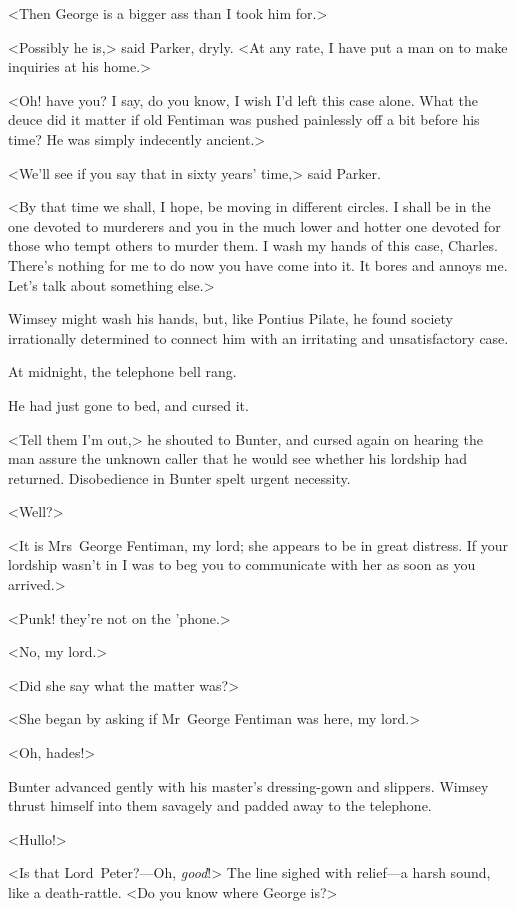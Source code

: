 <Then George is a bigger ass than I took him for.>

<Possibly he is,> said Parker, dryly. <At any rate, I have put a man on to make inquiries at his home.>

<Oh! have you? I say, do you know, I wish I'd left this case alone. What the deuce did it matter if old Fentiman was pushed painlessly off a bit before his time? He was simply indecently ancient.>

<We'll see if you say that in sixty years' time,> said Parker.

<By that time we shall, I hope, be moving in different circles. I shall be in the one devoted to murderers and you in the much lower and hotter one devoted for those who tempt others to murder them. I wash my hands of this case, Charles. There's nothing for me to do now you have come into it. It bores and annoys me. Let's talk about something else.>

Wimsey might wash his hands, but, like Pontius Pilate, he found society irrationally determined to connect him with an irritating and unsatisfactory case.

At midnight, the telephone bell rang.

He had just gone to bed, and cursed it.

<Tell them I'm out,> he shouted to Bunter, and cursed again on hearing the man assure the unknown caller that he would see whether his lordship had returned. Disobedience in Bunter spelt urgent necessity.

<Well?>

<It is Mrs~George Fentiman, my lord; she appears to be in great distress. If your lordship wasn't in I was to beg you to communicate with her as soon as you arrived.>

<Punk! they're not on the 'phone.>

<No, my lord.>

<Did she say what the matter was?>

<She began by asking if Mr~George Fentiman was here, my lord.>

<Oh, hades!>

Bunter advanced gently with his master's dressing-gown and slippers. Wimsey thrust himself into them savagely and padded away to the telephone.

<Hullo!>

<Is that Lord~Peter?—Oh, \emph{good}!> The line sighed with relief—a harsh sound, like a death-rattle. <Do you know where George is?>

